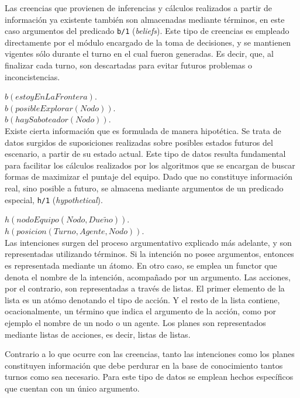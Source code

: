 \documentclass[oneside]{book}
\theoremstyle{definition}
\theoremstyle{example}
\newcommand{\lit}[1]{\mbox{$ #1$}}
\begin{document}
Las creencias que provienen de inferencias y cálculos realizados a partir de información 
ya existente también son almacenadas mediante términos, en este caso argumentos del 
predicado \texttt{b/1} (\textit{beliefs}). Este tipo de creencias es empleado directamente 
por el módulo encargado de la toma de decisiones, y se mantienen vigentes sólo durante el 
turno en el cual fueron generadas. Es decir, que, al finalizar cada turno, son descartadas 
para evitar futuros problemas o inconcistencias.

\vspace*{1em}
\noindent\lit{b(estoyEnLaFrontera).}\\
\lit{b(posibleExplorar(Nodo)).}\\
\lit{b(haySaboteador(Nodo)).}\\


Existe cierta información que es formulada de manera hipotética. Se trata de datos 
surgidos de suposiciones realizadas sobre posibles estados futuros del escenario, a partir 
de su estado actual. Este tipo de datos resulta fundamental para facilitar los cálculos 
realizados por los algoritmos que se encargan de buscar formas de maximizar el puntaje 
del equipo. Dado que no constituye información real, sino posible a futuro, se almacena 
mediante argumentos de un predicado especial, \texttt{h/1} (\textit{hypothetical}).

\vspace*{1em}
\noindent\lit{h(nodoEquipo(Nodo, Due\tilde{n}o)).}\\
\lit{h(posicion(Turno, Agente, Nodo)).}\\


Las intenciones surgen del proceso argumentativo explicado más adelante, y son 
representadas utilizando términos. Si la intención no posee argumentos, entonces es 
representada mediante un átomo. En otro caso, se emplea un functor que denota el 
nombre de la intención, acompañado por un argumento. Las acciones, por el contrario, 
son representadas a través de listas. El primer elemento de la lista es un atómo denotando 
el tipo de acción. Y el resto de la lista contiene, ocacionalmente, un término que 
indica el argumento de la acción, como por ejemplo el nombre de un nodo o un agente.
Los planes son representados mediante listas de acciones, es decir, listas de listas.

Contrario a lo que ocurre con las creencias, tanto las intenciones como los planes 
constituyen información que debe perdurar en la base de conocimiento tantos turnos 
como sea necesario. Para este tipo de datos se emplean hechos específicos que cuentan 
con un único argumento.
\end{document}
